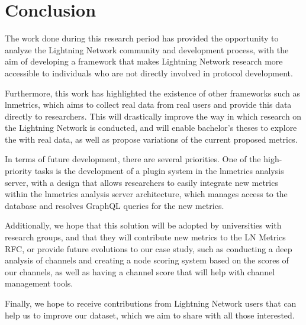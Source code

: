 \chapter{Conclusion}
\label{chap:conclusion}

The work done during this research period has provided the opportunity
to analyze the Lightning Network community and development process,
with the aim of developing a framework that makes Lightning Network
research more accessible to individuals who are not directly
involved in protocol development.

Furthermore, this work has highlighted the existence of other
frameworks such as lnmetrics, which aims to collect real data from
real users and provide this data directly to researchers. This will
drastically improve the way in which research on the Lightning Network is
conducted, and will enable bachelor's theses to explore the {\LN}
with real data, as well as propose variations of the current proposed metrics.

In terms of future development, there are several priorities.
One of the high-priority tasks is the development of a plugin system
in the lnmetrics analysis server, with a design that allows researchers to easily
integrate new metrics within the lnmetrics analysis server architecture,
which manages access to the database and resolves GraphQL queries for the new metrics.

Additionally, we hope that this solution will be adopted by universities with {\LN}
research groups, and that they will contribute new metrics to the LN Metrics RFC,
or provide future evolutions to our case study, such as conducting a deep analysis
of channels and creating a node scoring system based on the scores of our channels,
as well as having a channel score that will help with channel management tools.

Finally, we hope to receive contributions from Lightning Network users that can
help us to improve our dataset, which we aim to share with all those interested.
